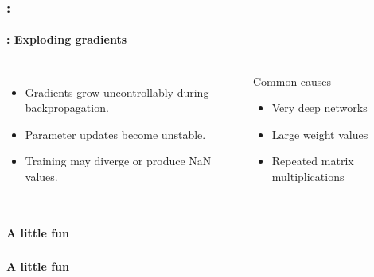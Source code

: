 \documentclass[xcolor=table]{beamer}
\begin{document}
\begin{frame}
	\frametitle{\insertshortsubtitle: \insertsection}
	\framesubtitle{\insertsubsection: Exploding gradients}
	
	\begin{columns}
		
		
		\begin{itemize}
			\item Gradients grow uncontrollably during backpropagation.
			\item Parameter updates become unstable.
			\item Training may diverge or produce NaN values.
		\end{itemize}
		
		\vspace{0.3cm}
		
		\begin{block}{Common causes}
			\begin{itemize}
				\item Very deep networks
				\item Large weight values
				\item Repeated matrix multiplications
			\end{itemize}
		\end{block}
		
		
		\begin{center}
		\end{center}
		
	\end{columns}
	
\end{frame}

\begin{frame}
	\frametitle{\insertshortsubtitle}
	\framesubtitle{A little fun}
	
	
\end{frame}

\begin{frame}
	\frametitle{\insertshortsubtitle}
	\framesubtitle{A little fun}
	
	\begin{center}
	\end{center}
	
\end{frame}


\end{document}
